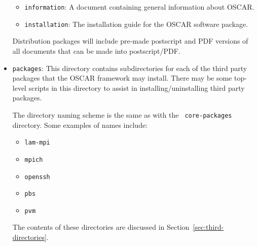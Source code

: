 \begin{itemize}
\begin{itemize}
  \item {\tt information}: A document containing general information
    about OSCAR.
    
  \item {\tt installation}: The installation guide for the OSCAR
    software package.
  \end{itemize}
  
  Distribution packages will include pre-made postscript and PDF
  versions of all documents that can be made into postscript/PDF.

\item {\tt packages}: This directory contains subdirectories for each
  of the third party packages that the OSCAR framework may install.
  There may be some top-level scripts in this directory to assist in
  installing/uninstalling third party packages.

  The directory naming scheme is the same as with the {\tt
    core-packages} directory.  Some examples of names include:

  \begin{itemize}
  \item {\tt lam-mpi}
  \item {\tt mpich}
  \item {\tt openssh}
  \item {\tt pbs}
  \item {\tt pvm}
  \end{itemize}
  
  The contents of these directories are discussed in
  Section~\ref{sec:third-directories}.

\end{itemize}

